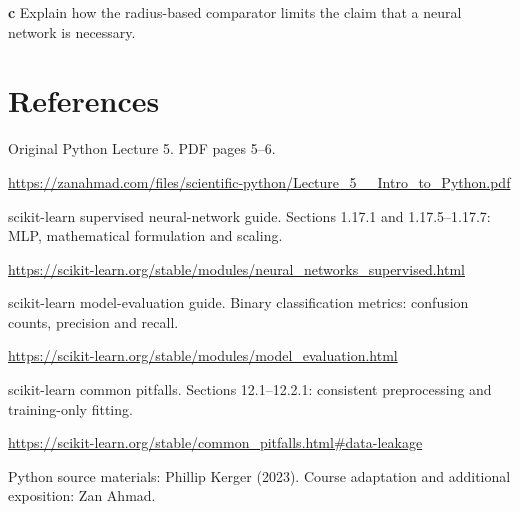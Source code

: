 \documentclass[11pt,letterpaper]{article}
\theoremstyle{definition}\newtheorem{definition}{Definition}\newtheorem{example}{Example}
\numberwithin{equation}{section}
\begin{document}
\textbf{c} Explain how the radius-based comparator limits the claim that a neural network is necessary.

\section*{References}
\noindent\begin{minipage}{\linewidth}
Original Python Lecture 5. PDF pages 5--6.

\url{https://zanahmad.com/files/scientific-python/Lecture_5__Intro_to_Python.pdf}
\end{minipage}\par\medskip
\noindent\begin{minipage}{\linewidth}
scikit-learn supervised neural-network guide. Sections 1.17.1 and 1.17.5--1.17.7: MLP, mathematical formulation and scaling.

\url{https://scikit-learn.org/stable/modules/neural_networks_supervised.html}
\end{minipage}\par\medskip
\noindent\begin{minipage}{\linewidth}
scikit-learn model-evaluation guide. Binary classification metrics: confusion counts, precision and recall.

\url{https://scikit-learn.org/stable/modules/model_evaluation.html}
\end{minipage}\par\medskip
\noindent\begin{minipage}{\linewidth}
scikit-learn common pitfalls. Sections 12.1--12.2.1: consistent preprocessing and training-only fitting.

\url{https://scikit-learn.org/stable/common_pitfalls.html#data-leakage}
\end{minipage}\par\medskip
Python source materials: Phillip Kerger (2023). Course adaptation and additional exposition: Zan Ahmad.
\end{document}
